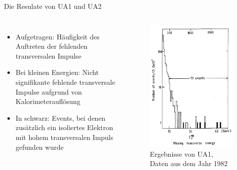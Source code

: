 \documentclass[aspectratio=1610, professionalfonts, 10pt]{beamer}
\begin{document}
\begin{frame}[plain]{Die Resulate von UA1 und UA2}
		\vspace*{-40px}
	\begin{columns}
			\begin{itemize}
				\setlength\itemsep{0.5em}
				\item Aufgetragen: Häufigkeit des Auftreten der fehlenden transversalen Impulse
				\item Bei kleinen Energien: Nicht signifikante fehlende transversale Impulse aufgrund von Kalorimeterauflösung
				\item In schwarz: Events, bei denen zusätzlich ein isoliertes Elektron mit hohem transversalen Impuls gefunden wurde
			\end{itemize}
			\begin{figure}
	  			\centering
				\includegraphics[width=0.65\textheight]{Images/Screenshot_2018-12-04_18-09-05.png}
				\caption{Ergebnisse von UA1, Daten aus dem Jahr 1982 \cite{doi:10.1142/9789814644150_0006}}
	  			\label{fig:sad}
			\end{figure}
	\end{columns}
\end{frame}
\end{document}
